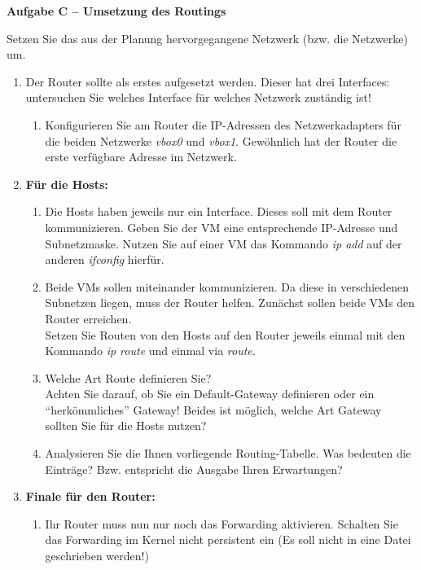 \documentclass[paper=a4,fontsize=11pt]{scrartcl}%
\begin{document}
\begin{center}\Large{\textbf{Aufgabe C -- Umsetzung des Routings}}\end{center}\vskip0.25in
Setzen Sie das aus der Planung hervorgegangene Netzwerk (bzw. die Netzwerke) um.
\begin{enumerate}
	\item Der Router sollte als erstes aufgesetzt werden. Dieser hat drei Interfaces: untersuchen Sie welches Interface für welches Netzwerk zuständig ist!
	\begin{enumerate}
		\item Konfigurieren Sie am Router die IP-Adressen des Netzwerkadapters für die beiden Netzwerke \emph{vbox0} und \emph{vbox1}. Gewöhnlich hat der Router die erste verfügbare Adresse im Netzwerk.
	\end{enumerate}
	\item \textbf{Für die Hosts:}\\
	\begin{enumerate}
		\item Die Hosts haben jeweils nur ein Interface. Dieses soll mit dem Router kommunizieren. Geben Sie der VM eine entsprechende IP-Adresse und  Subnetzmaske. Nutzen Sie auf einer VM das Kommando \emph{ip add} auf der anderen \emph{ifconfig} hierfür.
		\item Beide VMs sollen miteinander kommunizieren. Da diese in verschiedenen Subnetzen liegen, muss der Router helfen. Zunächst sollen beide VMs den Router erreichen.\\
		Setzen Sie Routen von den Hosts auf den Router jeweils einmal mit den Kommando \emph{ip route} und einmal via \emph{route}.
		\item Welche Art Route definieren Sie?\\
		Achten Sie darauf, ob Sie ein Default-Gateway definieren oder ein \enquote{herkömmliches} Gateway! Beides ist möglich, welche Art Gateway sollten Sie für die Hosts nutzen?
		\item Analysieren Sie die Ihnen vorliegende Routing-Tabelle. Was bedeuten die Einträge? Bzw. entspricht die Ausgabe Ihren Erwartungen?
	\end{enumerate}
	\item \textbf{Finale für den Router:}\\
	\begin{enumerate}
		\item Ihr Router muss nun nur noch das Forwarding aktivieren. Schalten Sie das Forwarding im Kernel nicht persistent ein (Es soll nicht in eine Datei geschrieben werden!)

\end{enumerate}
\end{enumerate}
\end{document}
